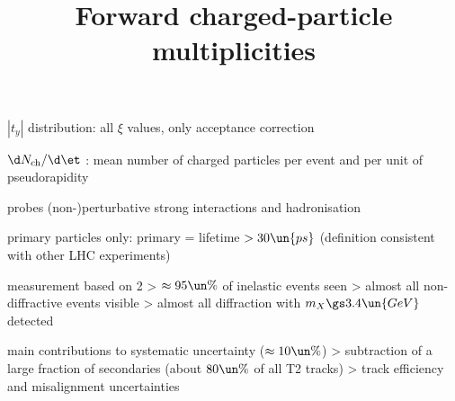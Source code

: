 \newpage %

\> $|t_y|$ distribution: all $\xi$ values, only acceptance correction


\newpage %
\title{Forward charged-particle multiplicities}

\> $\d N_{\rm ch} / \d\et$ : mean number of charged particles per event and per unit of pseudorapidity

\> probes (non-)perturbative strong interactions and hadronisation 

\> primary particles only: primary = lifetime $> 30\un{ps}$ (definition consistent with other LHC experiments)

\> measurement based on 2
\>> $\approx 95\un{\%}$ of inelastic events seen
\>> almost all non-diffractive events visible
\>> almost all diffraction with $m_X \gs 3.4\un{GeV}$ detected

\centerline{}


\newpage %


\centerline{
	\hskip3mm
}

\> main contributions to systematic uncertainty ($\approx 10\un{\%}$)
\>> subtraction of a large fraction of secondaries (about $80\un{\%}$ of all T2 tracks)
\>> track efficiency and misalignment uncertainties




